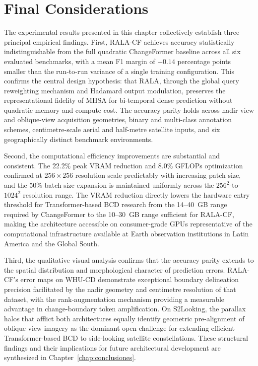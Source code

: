 \section{Final Considerations}
\label{sec:exp-final}

The experimental results presented in this chapter collectively establish three
principal empirical findings. First, \ac{RALA-CF} achieves accuracy statistically
indistinguishable from the full quadratic ChangeFormer baseline across all six
evaluated benchmarks, with a mean F1 margin of $+0.14$ percentage points smaller
than the run-to-run variance of a single training configuration. This confirms
the central design hypothesis: that \ac{RALA}, through the global query reweighting
mechanism and Hadamard output modulation, preserves the representational fidelity
of \ac{MHSA} for bi-temporal dense prediction without quadratic memory and compute
cost. The accuracy parity holds across nadir-view and oblique-view acquisition
geometries, binary and multi-class annotation schemes, centimetre-scale aerial and
half-metre satellite inputs, and six geographically distinct benchmark
environments.

Second, the computational efficiency improvements are substantial and consistent.
The 22.2\% peak \ac{VRAM} reduction and 8.0\% \ac{GFLOPs} optimization confirmed
at $256 \times 256$ resolution scale predictably with increasing patch size, and
the 50\% batch size expansion is maintained uniformly across the
$256^2$-to-$1024^2$ resolution range. The \ac{VRAM} reduction directly lowers the
hardware entry threshold for Transformer-based \ac{BCD} research from the
14--40~GB range required by ChangeFormer to the 10--30~GB range sufficient for
\ac{RALA-CF}, making the architecture accessible on consumer-grade \ac{GPU}s
representative of the computational infrastructure available at Earth observation
institutions in Latin America and the Global South.

Third, the qualitative visual analysis confirms that the accuracy parity extends
to the spatial distribution and morphological character of prediction errors.
\ac{RALA-CF}'s error maps on WHU-CD demonstrate exceptional boundary delineation
precision facilitated by the nadir geometry and centimetre resolution of that
dataset, with the rank-augmentation mechanism providing a measurable advantage in
change-boundary token amplification. On S2Looking, the parallax halos that afflict
both architectures equally identify geometric pre-alignment of oblique-view imagery
as the dominant open challenge for extending efficient Transformer-based \ac{BCD}
to side-looking satellite constellations. These structural findings and their
implications for future architectural development are synthesized in
Chapter~\ref{chap:conclusiones}.
